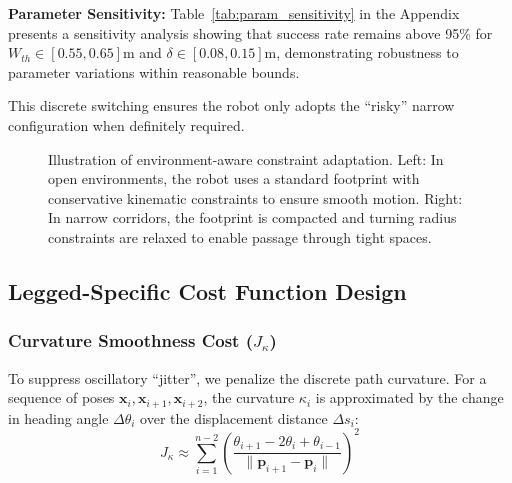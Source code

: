 \documentclass[lettersize,journal]{IEEEtran}
\begin{document}
\textbf{Parameter Sensitivity:} Table~\ref{tab:param_sensitivity} in the Appendix presents a sensitivity analysis showing that success rate remains above 95\% for $W_{th} \in [0.55, 0.65]\text{m}$ and $\delta \in [0.08, 0.15]\text{m}$, demonstrating robustness to parameter variations within reasonable bounds.

This discrete switching ensures the robot only adopts the ``risky'' narrow configuration when definitely required.

\begin{figure}[!t]
\centering
\caption{Illustration of environment-aware constraint adaptation. Left: In open environments, the robot uses a standard footprint with conservative kinematic constraints to ensure smooth motion. Right: In narrow corridors, the footprint is compacted and turning radius constraints are relaxed to enable passage through tight spaces.}
\label{fig:constraint_adaptation}
\end{figure}

\subsection{Legged-Specific Cost Function Design}

\subsubsection{Curvature Smoothness Cost ($J_{\kappa}$)}
To suppress oscillatory ``jitter'', we penalize the discrete path curvature. For a sequence of poses $\mathbf{x}_i, \mathbf{x}_{i+1}, \mathbf{x}_{i+2}$, the curvature $\kappa_i$ is approximated by the change in heading angle $\Delta \theta_i$ over the displacement distance $\Delta s_i$:
\begin{equation}
J_{\kappa} \approx \sum_{i=1}^{n-2} \left( \frac{\theta_{i+1} - 2\theta_i + \theta_{i-1}}{\|\mathbf{p}_{i+1} - \mathbf{p}_i\|} \right)^2
\end{equation}
\end{document}
